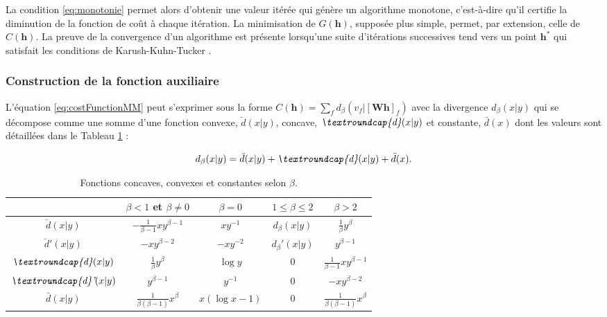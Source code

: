La condition \ref{eq:monotonie} permet alors d'obtenir une valeur itérée qui génère un algorithme monotone, c'est-à-dire qu'il certifie la diminution de la fonction de coût à chaque itération. La minimisation de $G(\mathbf{h})$, supposée plus simple, permet,  par extension, celle de $C(\mathbf{h})$. La preuve de la convergence d'un algorithme est présente lorsqu'une suite d'itérations successives tend vers un point $\mathbf{h^*}$ qui satisfait les conditions de Karush-Kuhn-Tucker \cite{fevotte_algorithms_2011, kuhn1982nonlinear}.

\subsubsection{Construction de la fonction auxiliaire}

L'équation \ref{eq:costFunctionMM} peut s'exprimer sous la forme $C(\mathbf{h}) = \sum_f d_{\beta}\left(v_f \vert \left[ \mathbf{Wh} \right]_f \right)$ avec la divergence $d_{\beta}(x \vert y)$ qui se décompose comme une somme d'une fonction convexe,  $\breve{d}(x\vert y)$, concave, $\textit{\textroundcap{d}}(x\vert y)$ et constante, $\bar{d}(x)$ dont les valeurs sont détaillées dans le Tableau \ref{tab:fonctionConcaveConvexe} :

\begin{equation}
d_{\beta}(x\vert y) = \breve{d}(x\vert y) + \textit{\textroundcap{d}}(x\vert y) + \bar{d}(x).
\end{equation}

\begin{table}[t]
\centering
	\begin{tabular}{|*{5}{c|}}
 		\hline
   		 & $\beta < 1$ et $\beta \neq 0$  & $\beta = 0$ & $1 \leq \beta \leq 2$ & $\beta > 2$  \\
   		\hline
   		$\breve{d}(x\vert y)$&$-\frac{1}{\beta -1}xy^{\beta-1}$ & $xy^{-1}$ & $d_{\beta}(x\vert y)$& $\frac{1}{\beta}y^{\beta}$ \\
   		\hline
   		$\breve{d}'(x\vert y)$& $-xy^{\beta-2}$ & $-xy^{-2}$ & $d_{\beta}'(x\vert y)$ & $y^{\beta-1}$\\
   		\hline
   		$\textit{\textroundcap{d}}(x\vert y)$& $\frac{1}{\beta}y^{\beta}$ & $\log y$ & 0 & $\frac{1}{\beta-1}xy^{\beta-1}$ \\
   		\hline
   		$\textit{\textroundcap{d}'}(x\vert y)$& $y^{\beta-1}$ & $y^{-1}$ & 0 & $-xy^{\beta-2}$ \\
   		\hline
   		$\bar{d}(x\vert y)$& $\frac{1}{\beta(\beta-1)}x^{\beta}$ & $x(\log x-1)$ & 0 & $\frac{1}{\beta(\beta-1)}x^{\beta}$\\
   		\hline
 	\end{tabular}
\caption{Fonctions concaves, convexes et constantes selon $\beta$.}
\label{tab:fonctionConcaveConvexe}
\end{table}

